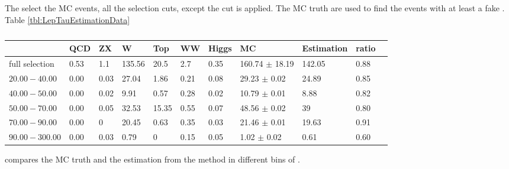 The select the MC events, all the selection cuts, except the \mttwo cut is applied. 
The MC truth are used to find the events with at least a fake \Tau. Table \ref{tbl:LepTauEstimationData}
\begin{table}
\begin{center}
\begin{tiny}
\begin{tabular}{lllllllllll}
\hline
\hline
               &  QCD     &  ZX     &  W     & Top      & WW      & Higgs     & MC                 &  Estimation &ratio        &      \\             
\hline
\hline
full selection & 0.53     & 1.1     & 135.56 & 20.5     & 2.7     & 0.35       & 160.74 $\pm$ 18.19 & 142.05    &  0.88 \\
$20.00-40.00$  & 0.00     & 0.03    & 27.04  & 1.86     & 0.21    & 0.08       & 29.23 $\pm$ 0.02   & 24.89     &  0.85 \\
$40.00-50.00$  & 0.00     & 0.02    & 9.91   & 0.57     & 0.28    & 0.02       & 10.79 $\pm$ 0.01   & 8.88      &  0.82 \\
$50.00-70.00$  & 0.00     & 0.05    & 32.53  & 15.35    & 0.55    & 0.07       & 48.56 $\pm$ 0.02   & 39        &  0.80 \\
$70.00-90.00$  & 0.00     & 0       & 20.45  & 0.63     & 0.35    & 0.03       & 21.46 $\pm$ 0.01   & 19.63     &  0.91 \\
$90.00-300.00$ & 0.00     & 0.03    & 0.79   & 0        & 0.15    & 0.05       & 1.02 $\pm$ 0.02    & 0.61      &   0.60
\hline
\hline
\end{tabular}
\caption{}
\label{tbl:LepTauEstimationClosure}
\end{tiny}
\end{center}
\end{table}
compares the MC truth and the estimation from the method in different bins of \mttwo.
